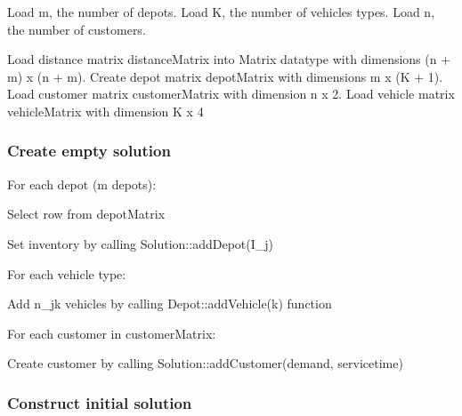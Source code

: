 Load {\ttfamily m}, the number of depots. Load {\ttfamily K}, the number of vehicles types. Load {\ttfamily n}, the number of customers.

Load distance matrix {\ttfamily distance\+Matrix} into Matrix datatype with dimensions (n + m) x (n + m). Create depot matrix {\ttfamily depot\+Matrix} with dimensions m x (K + 1). Load customer matrix {\ttfamily customer\+Matrix} with dimension n x 2. Load vehicle matrix {\ttfamily vehicle\+Matrix} with dimension K x 4

\subsubsection*{Create empty solution}

For each depot (m depots)\+:
\begin{DoxyItemize}
\item Select row from {\ttfamily depot\+Matrix}
\item Set inventory by calling {\ttfamily Solution\+::add\+Depot(\+I\+\_\+j)}
\item For each vehicle type\+:
\begin{DoxyItemize}
\item Add {\ttfamily n\+\_\+jk} vehicles by calling {\ttfamily Depot\+::add\+Vehicle(k)} function
\end{DoxyItemize}
\end{DoxyItemize}

For each customer in {\ttfamily customer\+Matrix}\+:
\begin{DoxyItemize}
\item Create customer by calling {\ttfamily Solution\+::add\+Customer(demand, servicetime)}
\end{DoxyItemize}

\subsubsection*{Construct initial solution}


